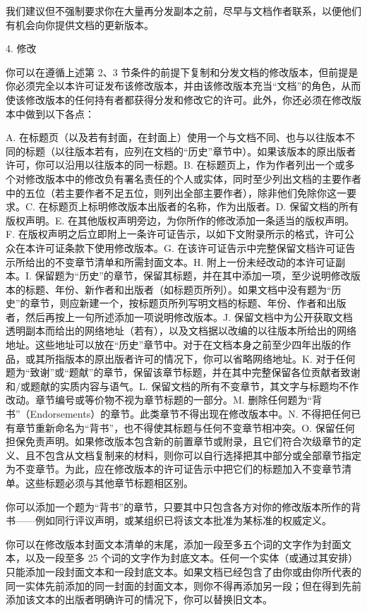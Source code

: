 \documentclass[a4paper]{rapport3}
\begin{document}
我们建议但不强制要求你在大量再分发副本之前，尽早与文档作者联系，以便他们有机会向你提供文档的更新版本。

4. 修改

你可以在遵循上述第 2、3 节条件的前提下复制和分发文档的修改版本，但前提是你必须完全以本许可证发布该修改版本，并由该修改版本充当“文档”的角色，从而使该修改版本的任何持有者都获得分发和修改它的许可。此外，你还必须在修改版本中做到以下各点：

A. 在标题页（以及若有封面，在封面上）使用一个与文档不同、也与以往版本不同的标题（以往版本若有，应列在文档的“历史”章节中）。如果该版本的原出版者许可，你可以沿用以往版本的同一标题。B. 在标题页上，作为作者列出一个或多个对修改版本中的修改负有署名责任的个人或实体，同时至少列出文档的主要作者中的五位（若主要作者不足五位，则列出全部主要作者），除非他们免除你这一要求。C. 在标题页上标明修改版本出版者的名称，作为出版者。D. 保留文档的所有版权声明。E. 在其他版权声明旁边，为你所作的修改添加一条适当的版权声明。F. 在版权声明之后立即附上一条许可证告示，以如下文附录所示的格式，许可公众在本许可证条款下使用修改版本。G. 在该许可证告示中完整保留文档许可证告示所给出的不变章节清单和所需封面文本。H. 附上一份未经改动的本许可证副本。I. 保留题为“历史”的章节，保留其标题，并在其中添加一项，至少说明修改版本的标题、年份、新作者和出版者（如标题页所列）。如果文档中没有题为“历史”的章节，则应新建一个，按标题页所列写明文档的标题、年份、作者和出版者，然后再按上一句所述添加一项说明修改版本。J. 保留文档中为公开获取文档透明副本而给出的网络地址（若有），以及文档据以改编的以往版本所给出的网络地址。这些地址可以放在“历史”章节中。对于在文档本身之前至少四年出版的作品，或其所指版本的原出版者许可的情况下，你可以省略网络地址。K. 对于任何题为“致谢”或“题献”的章节，保留该章节标题，并在其中完整保留各位贡献者致谢和/或题献的实质内容与语气。L. 保留文档的所有不变章节，其文字与标题均不作改动。章节编号或等价物不视为章节标题的一部分。M. 删除任何题为“背书”（Endorsements）的章节。此类章节不得出现在修改版本中。N. 不得把任何已有章节重新命名为“背书”，也不得使其标题与任何不变章节相冲突。O. 保留任何担保免责声明。如果修改版本包含新的前置章节或附录，且它们符合次级章节的定义、且不包含从文档复制来的材料，则你可以自行选择把其中部分或全部章节指定为不变章节。为此，应在修改版本的许可证告示中把它们的标题加入不变章节清单。这些标题必须与其他章节标题相区别。

你可以添加一个题为“背书”的章节，只要其中只包含各方对你的修改版本所作的背书——例如同行评议声明，或某组织已将该文本批准为某标准的权威定义。

你可以在修改版本封面文本清单的末尾，添加一段至多五个词的文字作为封面文本，以及一段至多 25 个词的文字作为封底文本。任何一个实体（或通过其安排）只能添加一段封面文本和一段封底文本。如果文档已经包含了由你或由你所代表的同一实体先前添加的同一封面的封面文本，则你不得再添加另一段；但在得到先前添加该文本的出版者明确许可的情况下，你可以替换旧文本。
\end{document}
